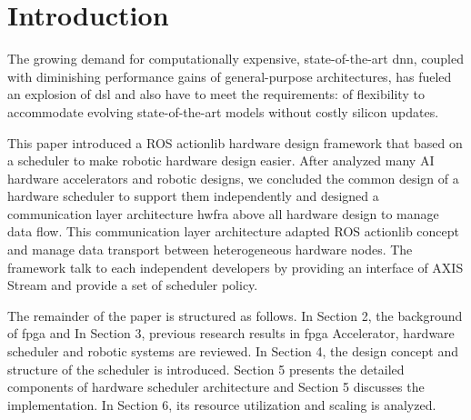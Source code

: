 \chapter{Introduction}
\label{sec:introduction}
The growing demand for computationally expensive, state-of-the-art \gls{dnn}, coupled with diminishing performance gains of general-purpose architectures, has fueled an explosion of \gls{dsl} and also have to meet the requirements: of flexibility to accommodate evolving state-of-the-art models without costly silicon updates. 

This paper introduced a ROS actionlib hardware design framework that based on a scheduler to make robotic hardware design easier. After analyzed many AI hardware accelerators and robotic designs, we concluded the common design of a hardware scheduler to support them independently and designed a communication layer architecture \gls{hwfra} above all hardware design to manage data flow. This communication layer architecture adapted ROS actionlib concept and manage data transport between heterogeneous hardware nodes. The framework talk to each independent developers by providing an interface of AXIS Stream and provide a set of scheduler policy.

The remainder of the paper is structured as follows. In Section 2, the background of \gls{fpga} and  In Section 3, previous research results in \gls{fpga} Accelerator, hardware scheduler and robotic systems are reviewed. In Section 4, the design concept and structure of the scheduler is introduced. Section 5 presents the detailed components of hardware scheduler architecture and Section 5 discusses the
implementation. In Section 6, its resource utilization and scaling is analyzed.
